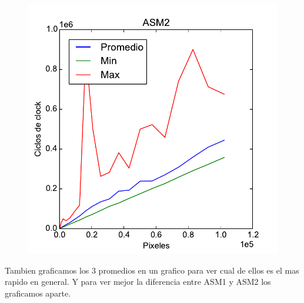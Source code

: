 \begin{figure}[h!]
	\includegraphics[scale=0.45]{images/asm2_merge}
\end{figure}

Tambien graficamos los 3 promedios en un grafico para ver cual de ellos es el mas rapido en general. Y para ver mejor la diferencia entre ASM1 y ASM2 los graficamos aparte.

